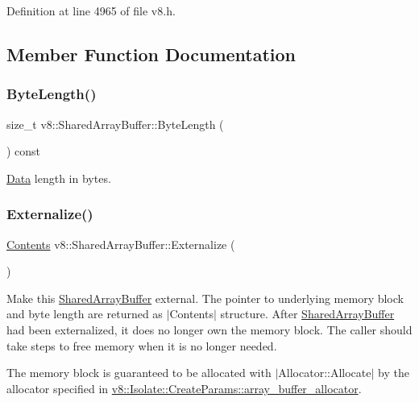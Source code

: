 Definition at line 4965 of file v8.\+h.



\subsection{Member Function Documentation}
\mbox{\label{classv8_1_1SharedArrayBuffer_a746f2632ad6c2d80e8f2e5e6e5b77f94}} 
\subsubsection{\texorpdfstring{Byte\+Length()}{ByteLength()}}
{\footnotesize\ttfamily size\+\_\+t v8\+::\+Shared\+Array\+Buffer\+::\+Byte\+Length (\begin{DoxyParamCaption}{ }\end{DoxyParamCaption}) const}

\mbox{\hyperlink{classv8_1_1Data}{Data}} length in bytes. \mbox{\label{classv8_1_1SharedArrayBuffer_afe025bbf668e64439cfc0044b353eb41}} 
\subsubsection{\texorpdfstring{Externalize()}{Externalize()}}
{\footnotesize\ttfamily \mbox{\hyperlink{classv8_1_1SharedArrayBuffer_1_1Contents}{Contents}} v8\+::\+Shared\+Array\+Buffer\+::\+Externalize (\begin{DoxyParamCaption}{ }\end{DoxyParamCaption})}

Make this \mbox{\hyperlink{classv8_1_1SharedArrayBuffer}{Shared\+Array\+Buffer}} external. The pointer to underlying memory block and byte length are returned as $\vert$\+Contents$\vert$ structure. After \mbox{\hyperlink{classv8_1_1SharedArrayBuffer}{Shared\+Array\+Buffer}} had been externalized, it does no longer own the memory block. The caller should take steps to free memory when it is no longer needed.

The memory block is guaranteed to be allocated with $\vert$\+Allocator\+::\+Allocate$\vert$ by the allocator specified in \mbox{\hyperlink{structv8_1_1Isolate_1_1CreateParams_a7c663f70b64290392eeaf164f57585f9}{v8\+::\+Isolate\+::\+Create\+Params\+::array\+\_\+buffer\+\_\+allocator}}. \mbox{\label{classv8_1_1SharedArrayBuffer_af5a160b645c5c674450d9501697c2cf4}} 
